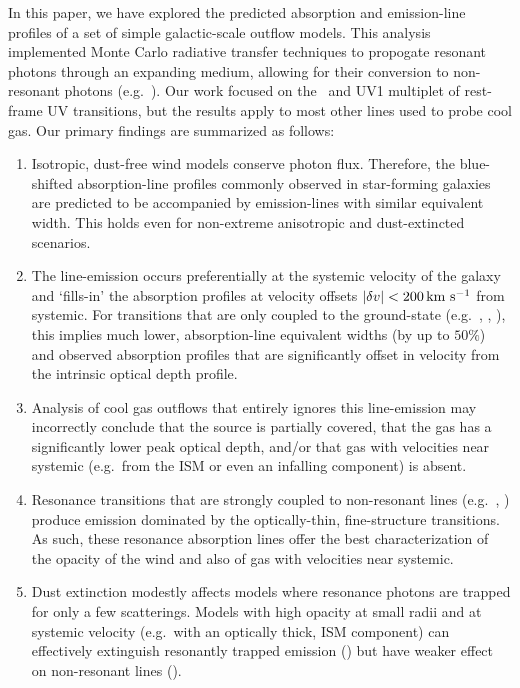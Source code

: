 \documentclass[12pt,preprint]{aastex}
\begin{document}
In this paper, we have explored the predicted absorption and
emission-line profiles of a set of simple galactic-scale outflow
models.  This analysis implemented Monte Carlo radiative transfer
techniques to propogate resonant photons through an expanding medium,
allowing for their conversion to non-resonant photons (e.g.\ \feiis).
Our work focused on the \mgiid\ and  UV1
multiplet of rest-frame UV transitions, but the results apply to
most other lines used to probe cool gas.  Our primary
findings are summarized as follows:

\begin{enumerate}

\item Isotropic, dust-free wind models conserve photon flux.
  Therefore, the blue-shifted absorption-line profiles commonly
  observed in star-forming galaxies are predicted to be accompanied by
  emission-lines with similar equivalent width.  This holds even for
  non-extreme anisotropic and dust-extincted scenarios.

\item The line-emission occurs preferentially at the systemic velocity
  of the galaxy and `fills-in' the absorption profiles at velocity
  offsets $|\delta v| < 200 \, {\rm km~s^{-1}}$ from systemic.  For transitions that
  are only coupled to the ground-state (e.g.\ , \lya,
  ),  this implies much lower, absorption-line equivalent widths (by up to
  $50\%$) and observed absorption profiles that are significantly offset in velocity
  from the intrinsic optical depth profile.

\item Analysis of cool gas outflows that entirely ignores this
  line-emission may incorrectly conclude that the source is partially
  covered, that the gas has a significantly lower peak optical depth, and/or that 
  gas with velocities near systemic (e.g.\ from the ISM or even
  an infalling component) is absent.   


\item Resonance transitions that are strongly coupled to
  non-resonant lines (e.g.\ , ) 
  produce emission dominated by the
  optically-thin, fine-structure transitions.  As such, these resonance
  absorption lines offer the best
  characterization of the opacity of the wind and also of gas 
  with velocities near systemic.  

\item  Dust extinction modestly affects 
  models where resonance photons are trapped for only a few scatterings.  Models
  with high opacity at small radii and at systemic velocity (e.g.\ with an
  optically thick, ISM component)  can effectively extinguish
  resonantly trapped emission () but have weaker
  effect on non-resonant lines (\feiis).


\end{enumerate}
\end{document}
